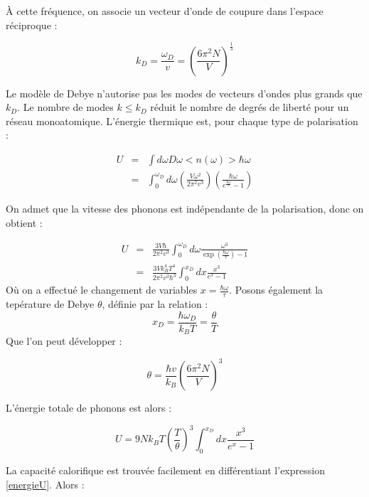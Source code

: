 À cette fréquence, on associe un vecteur d'onde de coupure dans l'espace
réciproque :

\begin{equation}
    k_D = \frac{\omega_D}{v} = \left( \frac{6\pi^2N}{V} \right)^{\frac{1}{3}}
\end{equation}

Le modèle de Debye n'autorise pas les modes de vecteurs d'ondes plus grands que
$k_D$. Le nombre de modes $k\leq k_D$ réduit le nombre de degrés de liberté
pour un réseau monoatomique.
L'énergie thermique est, pour chaque type de polarisation :

\begin{eqnarray}
U & = & \int d\omega D\omega <n(\omega)> \hbar \omega \\
 & = & \int_0^{\omega_D} d\omega \left( \frac{V\omega^2}{2\pi^2v^3} \right) \left( \frac{\hbar \omega}{e^{\frac{\hbar \omega}{\tau}} - 1} \right)
\end{eqnarray}

On admet que la vitesse des phonons est indépendante de la polarisation, donc on
obtient :

\begin{eqnarray}
    U &= & \frac{3V\hbar}{2\pi^2v^3} \int_0^{\omega_D} d\omega \frac{\omega^3}{\exp ( \frac{\hbar\omega}{\tau}) -1}\\
    \label{energieU}
    & = & \frac{3Vk_B^4 T^4}{2\pi^2v^3\hbar^3} \int_0^{x_D} dx \frac{x^3}{e^x -1}
\end{eqnarray}
Où on a effectué le changement de variables $x=\frac{\hbar\omega}{\tau}$. Posons
également la tepérature de Debye $\theta$, définie par la relation :
\begin{equation}
    x_D = \frac{\hbar \omega_D}{k_B T} = \frac{\theta}{T}
\end{equation}
Que l'on peut développer :

\begin{equation}
    \theta = \frac{\hbar v}{k_B} \left( \frac{6\pi^2 N}{V} \right)^3
\end{equation}

L'énergie totale de phonons est alors :

\begin{equation}
    U = 9 N k_B T \left( \frac{T}{\theta} \right)^3 \int_0^{x_D} dx \frac{x^3}{e^x -1}
\end{equation}

La capacité calorifique est trouvée facilement en différentiant l'expression
\ref{energieU}. Alors :

